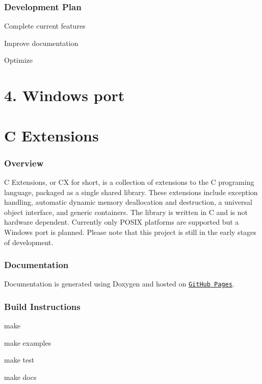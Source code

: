 \subsubsection*{Development Plan}


\begin{DoxyEnumerate}
\item Complete current features
\item Improve documentation
\item Optimize \section*{4. Windows port }
\end{DoxyEnumerate}

\section*{C Extensions}

\subsubsection*{Overview}

C Extensions, or CX for short, is a collection of extensions to the C programing language, packaged as a single shared library. These extensions include exception handling, automatic dynamic memory deallocation and destruction, a universal object interface, and generic containers. The library is written in C and is not hardware dependent. Currently only P\+O\+S\+IX platforms are supported but a Windows port is planned. Please note that this project is still in the early stages of development. \subsubsection*{Documentation}

Documentation is generated using Doxygen and hosted on \href{https://codrod.github.io/cx/index.html}{\tt Git\+Hub Pages}. \subsubsection*{Build Instructions}


\begin{DoxyItemize}
\item make 
\item make examples 
\item make test 
\item make docs 
\end{DoxyItemize}

